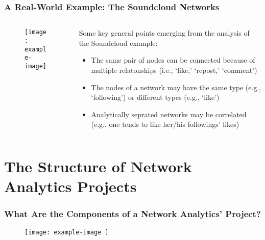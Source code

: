 \documentclass[notes, aspectratio=1610]{beamer}
\begin{document}
\begin{frame}
	\frametitle{A Real-World Example: The Soundcloud Networks}
	\begin{columns}
		\begin{column}{0.55\textwidth}
			\begin{figure}
				\begin{small}
					\begin{center}
						\texttt{[image: example-image]}
					\end{center}
				\end{small}
			\end{figure}
			
		\end{column}
		\begin{column}{0.4\textwidth}
			\begin{small}

			Some key general points emerging from the analysis of the 
			Soundcloud example:
			\begin{itemize}
				\item
				The same pair of nodes can be connected 
				because of multiple relatonships (i.e., `like,'
				`repost,' `comment')
				\item 
				The nodes of a network may have the 
				same type (e.g., `following') or 
				different types (e.g., `like')
				\item Analytically seprated networks may be 
				correlated (e.g., one tends to like her/his 
				followings' likes)
			\end{itemize}

			\end{small}
		\end{column}
	\end{columns}
\end{frame}

\section{The Structure of Network Analytics Projects}

\begin{frame}
%
% 
	\frametitle{What Are the Components of a Network Analytics' Project?}
	\begin{figure}
			\begin{center}
				\texttt{[image: 
					example-image
					]}
			\end{center}
	\end{figure}	
\end{frame}
\end{document}

